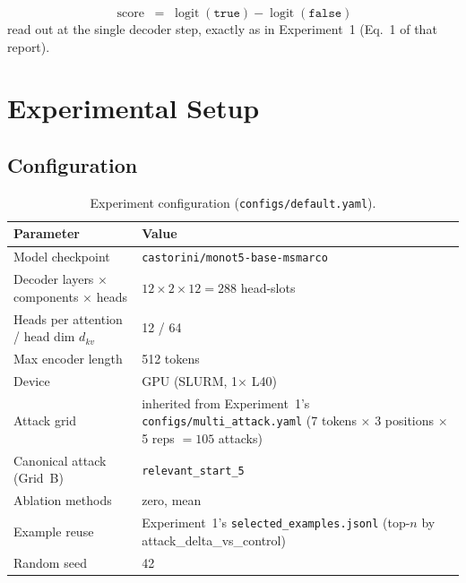 \documentclass[11pt]{article}
\newcommand{\score}{\operatorname{score}}
\begin{document}
\begin{equation}
\score \;=\; \operatorname{logit}(\texttt{true}) - \operatorname{logit}(\texttt{false})
\label{eq:score}
\end{equation}
read out at the single decoder step, exactly as in Experiment~1
(Eq.~1 of that report).

\section{Experimental Setup}

\subsection{Configuration}

\begin{table}[H]
\centering
\caption{Experiment configuration (\texttt{configs/default.yaml}).}
\label{tab:config}
\begin{tabular}{ll}
\toprule
Parameter & Value \\
\midrule
Model checkpoint            & \texttt{castorini/monot5-base-msmarco} \\
Decoder layers $\times$ components $\times$ heads
                             & $12 \times 2 \times 12 = 288$ head-slots \\
Heads per attention / head dim $d_{kv}$ & 12 / 64 \\
Max encoder length           & 512 tokens \\
Device                       & GPU (SLURM, 1$\times$ L40) \\
\midrule
Attack grid                  & inherited from Experiment~1's
                               \texttt{configs/multi\_attack.yaml}
                               (7 tokens $\times$ 3 positions $\times$
                               5 reps $=105$ attacks) \\
Canonical attack (Grid~B)    & \texttt{relevant\_start\_5} \\
Ablation methods             & zero, mean \\
Example reuse                & Experiment~1's
                               \texttt{selected\_examples.jsonl}
                               (top-$n$ by attack\_delta\_vs\_control) \\
Random seed                  & 42 \\
\bottomrule
\end{tabular}
\end{table}
\end{document}
